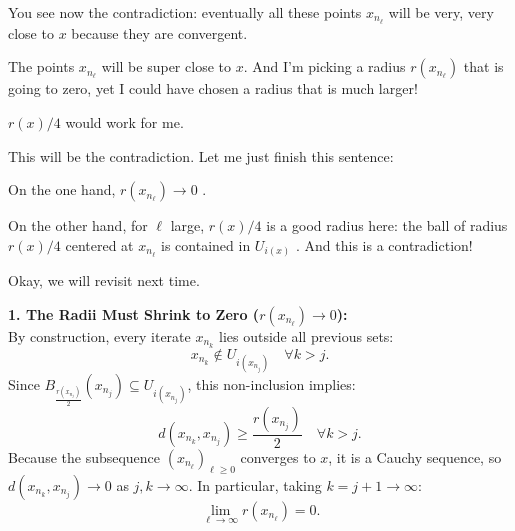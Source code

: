 \begin{proofWrapper}
\begin{speech}[01:24:25 - 01:26:37]
You see now the contradiction: eventually all these points $x_{n_\ell}$ will be very, very close to $x$ because they are convergent.

The points $x_{n_\ell}$ will be super close to $x$. And I'm picking a radius $r(x_{n_\ell})$ that is going to zero, yet I could have chosen a radius that is much larger!

$r(x) / 4$ would work for me.

This will be the contradiction. Let me just finish this sentence:

On the one hand, $r(x_{n_\ell}) \to 0$ .

On the other hand, for $\ell$ large, $r(x) / 4$ is a good radius here: the ball of radius $r(x) / 4$ centered at $x_{n_\ell}$ is contained in $U_{i(x)}$ . And this is a contradiction! 

Okay, we will revisit next time. 
\end{speech}

\begin{content}
\textbf{1. The Radii Must Shrink to Zero ($r(x_{n_\ell}) \to 0$):} \\
By construction, every iterate $x_{n_k}$ lies outside all previous sets:
\[
x_{n_k} \notin U_{i(x_{n_j})} \quad \forall k > j.
\]
Since $B_{\frac{r(x_{n_j})}{2}}(x_{n_j}) \subseteq U_{i(x_{n_j})}$, this non-inclusion implies:
\begin{equation}\label{eq:inter-point-distance-bound}
d(x_{n_k}, x_{n_j}) \ge \frac{r(x_{n_j})}{2} \quad \forall k > j.
\end{equation}
Because the subsequence $(x_{n_\ell})_{\ell \ge 0}$ converges to $x$, it is a Cauchy sequence, so $d(x_{n_k}, x_{n_j}) \to 0$ as $j, k \to \infty$. In particular, taking $k = j + 1 \to \infty$:
\begin{equation}\label{eq:radii-vanish}
\lim_{\ell \to \infty} r(x_{n_\ell}) = 0.
\end{equation}


\end{content}
\end{proofWrapper}
